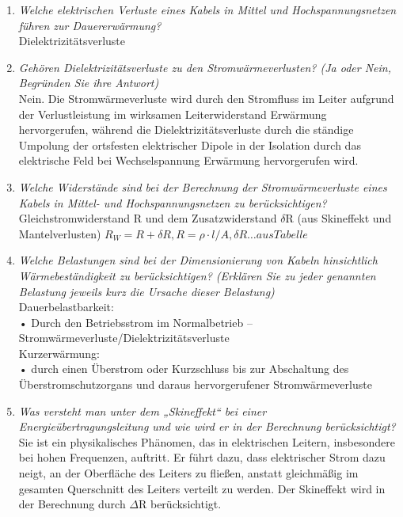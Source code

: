 \documentclass[12pt]{article}
\begin{document}
\begin{enumerate}
    \item \textit{Welche elektrischen Verluste eines Kabels in Mittel und Hochspannungsnetzen führen zur 
    Dauererwärmung? }\\
    Dielektrizitätsverluste
    \item \textit{Gehören Dielektrizitätsverluste zu den 
    Stromwärmeverlusten? (Ja oder Nein, Begründen 
    Sie ihre Antwort)}\\
    Nein. Die Stromwärmeverluste wird durch den Stromfluss im Leiter aufgrund der Verlustleistung im wirksamen 
    Leiterwiderstand Erwärmung hervorgerufen, während die Dielektrizitätsverluste durch die ständige Umpolung 
    der ortsfesten elektrischer Dipole in der Isolation durch das elektrische Feld bei Wechselspannung 
    Erwärmung hervorgerufen wird. 
    \item \textit{Welche Widerstände sind bei der Berechnung der 
    Stromwärmeverluste eines Kabels in Mittel- und 
    Hochspannungsnetzen zu berücksichtigen?}\\
    Gleichstromwiderstand R und dem Zusatzwiderstand $\delta$R (aus Skineffekt und Mantelverlusten)
    $R_W = R + \delta R, R= \rho \cdot l / A, \delta R \dots aus Tabelle$

    \item \textit{Welche Belastungen sind bei der Dimensionierung 
    von Kabeln hinsichtlich Wärmebeständigkeit zu 
    berücksichtigen? 
    (Erklären Sie zu jeder genannten Belastung jeweils 
    kurz die Ursache dieser Belastung)}\\
    Dauerbelastbarkeit: \\
    • Durch den Betriebsstrom im Normalbetrieb – Stromwärmeverluste/Dielektrizitätsverluste \\
    Kurzerwärmung: \\
    • durch einen Überstrom oder Kurzschluss bis zur Abschaltung des Überstromschutzorgans und daraus 
    hervorgerufener Stromwärmeverluste\\

    \item \textit{Was versteht man unter dem „Skineffekt“ bei einer 
    Energieübertragungsleitung und wie wird er in der 
    Berechnung berücksichtigt?}\\
    Sie ist ein physikalisches Phänomen, das in elektrischen Leitern, insbesondere bei hohen Frequenzen, auftritt. 
    Er führt dazu, dass elektrischer Strom dazu neigt, an der Oberfläche des Leiters zu fließen, 
    anstatt gleichmäßig im gesamten Querschnitt des Leiters verteilt zu werden. 
    Der Skineffekt wird in der Berechnung durch $\Delta$R berücksichtigt. 



\end{enumerate}
\end{document}
